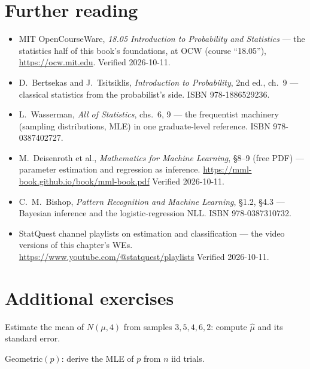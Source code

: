 \section*{Further reading}

\begin{itemize}
\item MIT OpenCourseWare, \emph{18.05 Introduction to Probability and
Statistics} --- the statistics half of this book's foundations, at OCW
(course ``18.05''), \url{https://ocw.mit.edu}. Verified 2026-10-11.
\item D.~Bertsekas and J.~Tsitsiklis, \emph{Introduction to
Probability}, 2nd ed., ch.~9 --- classical statistics from the
probabilist's side. ISBN 978-1886529236.
\item L.~Wasserman, \emph{All of Statistics}, chs.~6, 9 --- the
frequentist machinery (sampling distributions, MLE) in one
graduate-level reference. ISBN 978-0387402727.
\item M.~Deisenroth et al., \emph{Mathematics for Machine Learning},
\S8--9 (free PDF) --- parameter estimation and regression as
inference.\newline
\url{https://mml-book.github.io/book/mml-book.pdf}
Verified 2026-10-11.
\item C.~M.~Bishop, \emph{Pattern Recognition and Machine Learning},
\S1.2, \S4.3 --- Bayesian inference and the logistic-regression NLL.
ISBN 978-0387310732.
\item StatQuest channel playlists on estimation and classification ---
the video versions of this chapter's WEs.\newline
\url{https://www.youtube.com/@statquest/playlists}
Verified 2026-10-11.
\end{itemize}

\section*{Additional exercises}

\begin{exercise}[easy]
Estimate the mean of $N(\mu,4)$ from samples $3,5,4,6,2$: compute
$\hat\mu$ and its standard error.
\end{exercise}

\begin{exercise}[easy]
Geometric$(p)$: derive the MLE of $p$ from $n$ iid trials.
\end{exercise}

